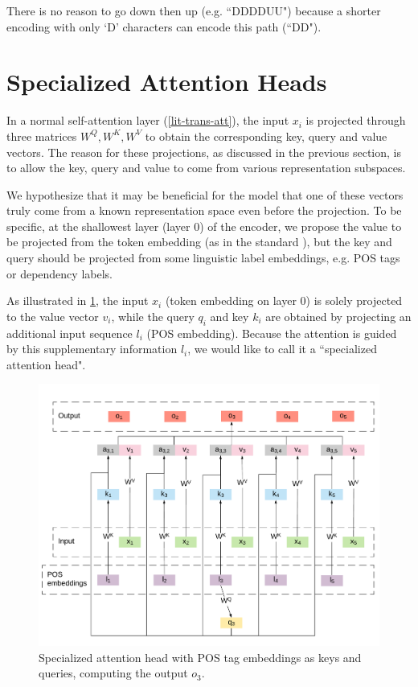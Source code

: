 There is no reason to go down then up (e.g. ``DDDDUU") because a shorter encoding with only `D' characters can encode this path (``DD").

\section{Specialized Attention Heads}
\label{enriching-specialized}

In a normal self-attention layer (\cref{lit-trans-att}), the input $x_i$ is projected through three matrices $W^Q, W^K, W^V$ to obtain the corresponding key, query and value vectors.
The reason for these projections, as discussed in the previous section, is to allow the key, query and value to come from various representation subspaces.

We hypothesize that it may be beneficial for the model that one of these vectors truly come from a known representation space even before the projection.
To be specific, at the shallowest layer (layer 0) of the encoder, we propose the value to be projected from the token embedding (as in the standard \transformer), but the key and query should be projected from some linguistic label embeddings, e.g. POS tags or dependency labels.

As illustrated in \cref{fig:specialized-heads}, the input $x_i$ (token embedding on layer 0) is solely projected to the value vector $v_i$, while the query $q_i$ and key $k_i$ are obtained by projecting an additional input sequence $l_i$ (POS embedding).
Because the attention is guided by this supplementary information $l_i$, we would like to call it a ``specialized attention head".

\begin{figure}[t]
    \centering
    \includegraphics[width=\linewidth]{img/specialized-head.pdf}
    \caption{Specialized attention head with POS tag embeddings as keys and queries, computing the output $o_3$.}
    \label{fig:specialized-heads}
\end{figure}

